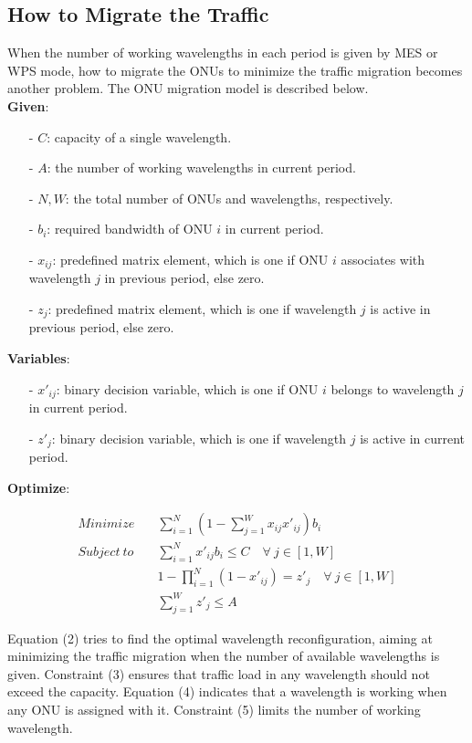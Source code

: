 \documentclass[letter]{IEEEtran}
\begin{document}
\subsection{How to Migrate the Traffic}
When the number of working wavelengths in each period is given by MES or WPS mode, how to migrate the ONUs to minimize the traffic migration becomes another problem. The ONU migration model is described below.\\
\textbf{Given}:
\begin{itemize}
	\item[-] $ C $: capacity of a single wavelength.
	\item[-]$ A $: the number of working wavelengths in current period.
	\item[-]$ N, W $: the total number of ONUs and wavelengths, respectively.
	\item[-]$ b_{i} $: required bandwidth of ONU $ i $ in current period.
	\item[-]$ x_{ij} $: predefined matrix element, which is one if ONU $ i $ associates with wavelength $ j $ in previous period, else zero.
	\item[-]$ z_{j} $: predefined matrix element, which is one if wavelength $ j $ is active in previous period, else zero.
\end{itemize}
\textbf{Variables}:
\begin{itemize}
	\item[-]$ x'_{ij} $: binary decision variable, which is one if ONU $ i $ belongs to wavelength $ j $ in current period.
	\item[-]$ z'_{j} $: binary decision variable, which is one if wavelength $ j $ is active in current period.
\end{itemize}
\textbf{Optimize}:
\begin{footnotesize}
\begin{align*}
Minimize \quad	&\sum_{i=1}^{N}(1-\sum_{j=1}^{W}x_{ij}x'_{ij})b_{i} \tag{$2$}\\
Subject \ to \quad    & \sum_{i=1}^{N}x'_{ij}b_{i} \leq C \quad \forall \ j \in [1,W] \tag{$3$} \\
    &1- \prod_{i=1}^{N}{(1 - x'_{ij})} = z'_{j} \quad \forall \ j \in [1,W] \tag{$4$} \\
    & \sum_{j=1}^{W}z'_j \leq A \tag{$5$}
\end{align*}
\end{footnotesize}

Equation (2) tries to find the optimal wavelength reconfiguration, aiming at minimizing the traffic migration when the number of available wavelengths is given. Constraint (3) ensures that traffic load in any wavelength should not exceed the capacity. Equation (4) indicates that a wavelength is working when any ONU is assigned with it. Constraint (5) limits the number of working wavelength.
\end{document}
